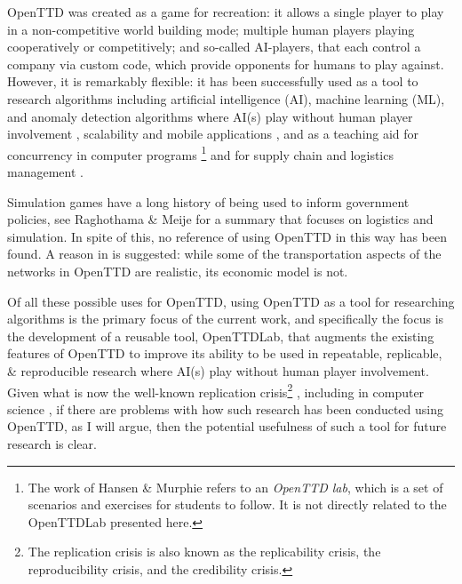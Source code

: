 \documentclass[logo,msc,dsti]{infthesis}    %
\begin{document}
OpenTTD was created as a game for recreation: it allows a single player to play in a non-competitive world building mode; multiple human players playing cooperatively or competitively; and so-called AI-players, that each control a company via custom code, which provide opponents for humans to play against. However, it is remarkably flexible: it has been successfully used as a tool to research algorithms including artificial intelligence (AI), machine learning (ML), and anomaly detection algorithms where AI(s) play without human player involvement \cite{beuneker2019autonomous, bijlsma2014evolving, konijnendijk2015mcts, lakomy2020railroad, rios2009trains, wisniewski2011artificial, volna2017fuzzy}, scalability and mobile applications \cite{jiang2018mirroring}, and as a teaching aid for concurrency in computer programs \cite{HansenMuprhie2018, marmorstein2015teaching}\footnote{The work of Hansen \& Murphie \cite{HansenMuprhie2018} refers to an \emph{OpenTTD lab}, which is a set of scenarios and exercises for students to follow. It is not directly related to the OpenTTDLab presented here.} and for supply chain and logistics management \cite{doi:10.1080/10494820.2016.1242503}.

Simulation games have a long history of being used to inform government policies, see Raghothama \& Meije \cite{raghothama2013review} for a summary that focuses on logistics and simulation. In spite of this, no reference of using OpenTTD in this way has been found. A reason in \cite{raghothama2013review} is suggested: while some of the transportation aspects of the networks in OpenTTD are realistic, its economic model is not.

Of all these possible uses for OpenTTD, using OpenTTD as a tool for researching algorithms is the primary focus of the current work, and specifically the focus is the development of a reusable tool, OpenTTDLab, that augments the existing features of OpenTTD to improve its ability to be used in repeatable, replicable, \& reproducible research where AI(s) play without human player involvement. Given what is now the well-known replication crisis\footnote{The replication crisis is also known as the replicability crisis, the reproducibility crisis, and the credibility crisis.} \cite{ioannidis2005most, baker20161}, including in computer science \cite{dalle2012reproducibility, CollbergChristianProebsting2016}, if there are problems with how such research has been conducted using OpenTTD, as I will argue, then the potential usefulness of such a tool for future research is clear.
\end{document}
